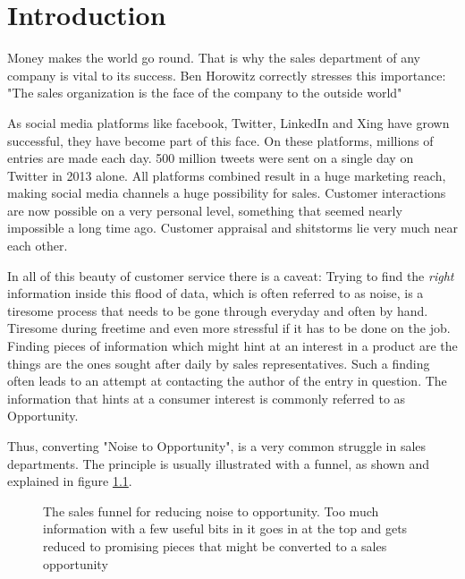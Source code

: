 \chapter{Introduction}\label{ch:introduction}
Money makes the world go round. That is why the sales department
of any company is vital to its success. Ben Horowitz correctly
stresses this importance: "The sales organization is the face of the company to the outside world" \cite{bh:2014}

As social media platforms like facebook, Twitter, LinkedIn and Xing
have grown successful, they have become part of this face.
On these platforms, millions of entries are made each day.
500 million tweets were sent on a single day on Twitter in 2013 alone.
All platforms combined result in a huge marketing reach,
making social media channels a huge possibility for sales.
Customer interactions are now possible on a very personal level,
something that seemed nearly impossible a long time ago.
Customer appraisal and shitstorms lie very much near each other.
\newline

In all of this beauty of customer service there is a caveat:
Trying to find the \textit{right} information inside this
flood of data, which is often referred to as noise, is a tiresome
process that needs to be gone through everyday and often by hand.
Tiresome during freetime and even more stressful if it has to be done on the job.
Finding pieces of information which might hint at an interest
in a product are the things are the ones sought after daily by sales representatives.
Such a finding often leads to an attempt at contacting the author of the
entry in question. The information that hints at a consumer interest is commonly
referred to as Opportunity.
\newline

Thus, converting "Noise to Opportunity", is a very common struggle
in sales departments. The principle is usually illustrated with a funnel,
as shown and explained in figure \ref{fig:sales-funnel}.


\begin{figure}[bth]
    \caption{The sales funnel for reducing noise to opportunity. Too much
    information with a few useful bits in it goes in at the top and gets
    reduced to promising pieces that might be converted to a sales opportunity}
    \label{fig:sales-funnel}
\end{figure}

